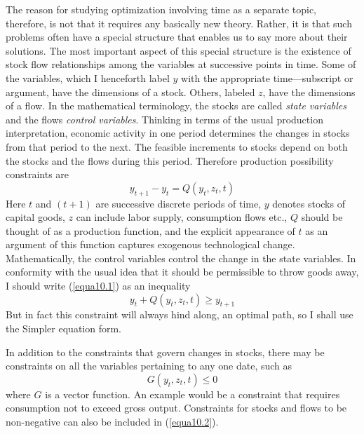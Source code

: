 The reason for studying optimization involving time as a separate topic, therefore, is not that it requires any basically new theory. Rather, it is that such problems often have a special structure that enables us to say more about their solutions. The most important aspect of this special structure is the existence of stock flow relationships among the variables at successive points in time. Some of the variables, which I henceforth label $y$ with the appropriate time—subscript or argument, have the dimensions of a stock. Others, labeled $z$, have the dimensions of a flow. In the mathematical terminology, the stocks are called \textit{state variables} and the flows \textit{control variables}. Thinking in terms of the usual production interpretation, economic activity in one period determines the changes in stocks from that period to the next. The feasible increments to stocks depend on both the stocks and the flows during this period. Therefore production possibility constraints are
\begin{equation} \label{equa10.1}
y_{t+1} - y_t = Q(y_t, z_t, t)
\end{equation}
Here $t$ and $(t+1)$ are successive discrete periods of time, $y$ denotes stocks of capital goods, $z$ can include labor supply, consumption flows etc., $Q$ should be thought of as a production function, and the explicit appearance of $t$ as an argument of this function captures exogenous technological change. Mathematically, the control variables control the change in the state variables. In conformity with the usual idea that it should be permissible to throw goods away, I should write (\ref{equa10.1}) as an inequality
\begin{equation*}
y_t + Q(y_t, z_t, t) \geq y_{t+1}
\end{equation*}
But in fact this constraint will always hind along, an optimal path, so I shall use the Simpler equation form.

In addition to the constraints that govern changes in stocks, there may be constraints on all the variables pertaining to any one
date, such as
\begin{equation} \label{equa10.2}
  G(y_t, z_t, t) \leq 0
\end{equation}
where $G$ is a vector function. An example would be a constraint that requires consumption not to exceed gross output. Constraints for stocks and flows to be non-negative can also be included in (\ref{equa10.2}).


